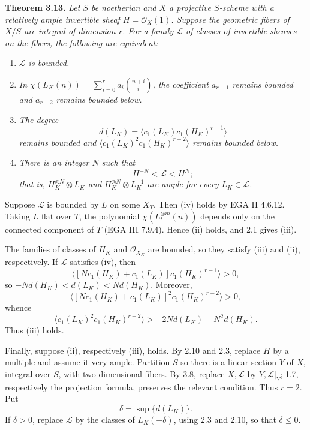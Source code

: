 \textbf{Theorem 3.13.} \emph{Let \(S\) be noetherian and \(X\) a
projective \(S\)-scheme with a relatively ample invertible sheaf
\(H=\mathcal O_X(1)\). Suppose the geometric fibers of \(X/S\) are
integral of dimension \(r\). For a family \(\mathscr L\) of classes of
invertible sheaves on the fibers, the following are equivalent:}
\begin{enumerate}[label=(\roman*)]
\item \emph{\(\mathscr L\) is bounded.}
\item \emph{In
\(\chi(L_K(n))=\sum_{i=0}^{r}a_i\binom{n+i}{i}\),
the coefficient \(a_{r-1}\) remains bounded and \(a_{r-2}\) remains
bounded below.}
\item \emph{The degree
\[
d(L_K)=\langle c_1(L_K)c_1(H_K)^{r-1}\rangle
\]
remains bounded and
\(\langle c_1(L_K)^2c_1(H_K)^{r-2}\rangle\) remains bounded below.}
\item \emph{There is an integer \(N\) such that
\[
H^{-N}<\mathscr L<H^N;
\]
that is, \(H_K^{\otimes N}\otimes L_K\) and
\(H_K^{\otimes N}\otimes L_K^{-1}\) are ample for every
\(L_K\in\mathscr L\).}
\end{enumerate}

Suppose \(\mathscr L\) is bounded by \(L\) on some \(X_T\). Then (iv)
holds by EGA II 4.6.12. Taking \(L\) flat over \(T\), the polynomial
\(\chi(L_t^{\otimes m}(n))\) depends only on the connected component of
\(T\) (EGA III 7.9.4). Hence (ii) holds, and 2.1 gives (iii).

The families of classes of \(H_K\) and \(\mathcal O_{X_K}\) are bounded,
so they satisfy (iii) and (ii), respectively. If \(\mathscr L\) satisfies
(iv), then
\[
\langle[Nc_1(H_K)+c_1(L_K)]c_1(H_K)^{r-1}\rangle>0,
\]
so \(-Nd(H_K)<d(L_K)<Nd(H_K)\). Moreover,
\[
\langle[Nc_1(H_K)+c_1(L_K)]^2c_1(H_K)^{r-2}\rangle>0,
\]
whence
\[
\langle c_1(L_K)^2c_1(H_K)^{r-2}\rangle
>-2Nd(L_K)-N^2d(H_K).
\]
Thus (iii) holds.

Finally, suppose (ii), respectively (iii), holds. By 2.10 and 2.3,
replace \(H\) by a multiple and assume it very ample. Partition \(S\) so
there is a linear section \(Y\) of \(X\), integral over \(S\), with
two-dimensional fibers. By 3.8, replace \(X,\mathscr L\) by
\(Y,\mathscr L|_Y\); 1.7, respectively the projection formula, preserves
the relevant condition. Thus \(r=2\). Put
\[
\delta=\sup\{d(L_K)\}.
\]
If \(\delta>0\), replace \(\mathscr L\) by the classes of
\(L_K(-\delta)\), using 2.3 and 2.10, so that \(\delta\le0\).

